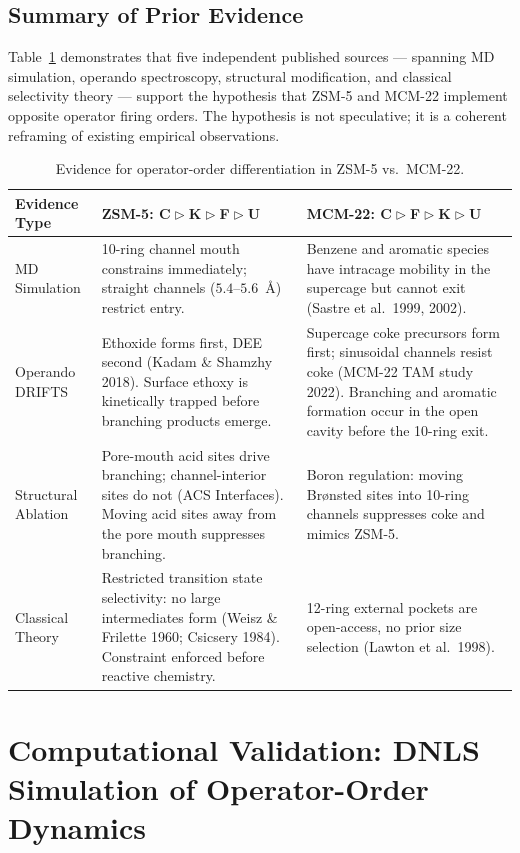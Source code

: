 \documentclass[11pt]{article}
\newcommand{\comp}{\mathrel{\triangleright}} %
\begin{document}
\subsection{Summary of Prior Evidence}

Table~\ref{tab:evidence} demonstrates that five independent published sources --- spanning MD simulation, operando spectroscopy, structural modification, and classical selectivity theory --- support the hypothesis that ZSM-5 and MCM-22 implement opposite operator firing orders. The hypothesis is not speculative; it is a coherent reframing of existing empirical observations.

\begin{table}[h]
\centering
\small
\caption{Evidence for operator-order differentiation in ZSM-5 vs.\ MCM-22.}
\label{tab:evidence}
\begin{tabular}{|p{2.1cm}|p{5.7cm}|p{5.7cm}|}
\hline
\textbf{Evidence Type} & \textbf{ZSM-5: C$\comp$K$\comp$F$\comp$U} & \textbf{MCM-22: C$\comp$F$\comp$K$\comp$U} \\
\hline
MD Simulation & 10-ring channel mouth constrains immediately; straight channels ($5.4$--$5.6$~\AA) restrict entry. & Benzene and aromatic species have intracage mobility in the supercage but cannot exit (Sastre et al.\ 1999, 2002). \\
\hline
Operando DRIFTS & Ethoxide forms first, DEE second (Kadam \& Shamzhy 2018). Surface ethoxy is kinetically trapped before branching products emerge. & Supercage coke precursors form first; sinusoidal channels resist coke (MCM-22 TAM study 2022). Branching and aromatic formation occur in the open cavity before the 10-ring exit. \\
\hline
Structural Ablation & Pore-mouth acid sites drive branching; channel-interior sites do not (ACS Interfaces). Moving acid sites away from the pore mouth suppresses branching. & Boron regulation: moving Br\o nsted sites into 10-ring channels suppresses coke and mimics ZSM-5. \\
\hline
Classical Theory & Restricted transition state selectivity: no large intermediates form (Weisz \& Frilette 1960; Csicsery 1984). Constraint enforced before reactive chemistry. & 12-ring external pockets are open-access, no prior size selection (Lawton et al.\ 1998). \\
\hline
\end{tabular}
\end{table}

\section{Computational Validation: DNLS Simulation of Operator-Order Dynamics}
\end{document}
